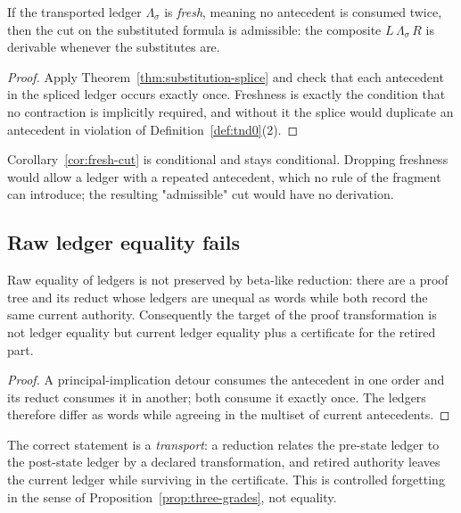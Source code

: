 \begin{corollary}\label{cor:fresh-cut}
If the transported ledger $\Lambda_\sigma$ is \emph{fresh}, meaning no antecedent is
consumed twice, then the cut on the substituted formula is admissible: the composite
$L\,\Lambda_\sigma\,R$ is derivable whenever the substitutes are.
\end{corollary}

\begin{proof}
Apply Theorem~\ref{thm:substitution-splice} and check that each antecedent in the spliced
ledger occurs exactly once.  Freshness is exactly the condition that no contraction is
implicitly required, and without it the splice would duplicate an antecedent in violation
of Definition~\ref{def:tnd0}(2).
\end{proof}

\begin{remark}
Corollary~\ref{cor:fresh-cut} is conditional and stays conditional.  Dropping freshness
would allow a ledger with a repeated antecedent, which no rule of the fragment can
introduce; the resulting "admissible" cut would have no derivation.
\end{remark}

\subsection{Raw ledger equality fails}

\begin{nogo}\label{nogo:raw-ledger}
Raw equality of ledgers is not preserved by beta-like reduction: there are a proof tree and
its reduct whose ledgers are unequal as words while both record the same current authority.
Consequently the target of the proof transformation is not ledger equality but current
ledger equality plus a certificate for the retired part.
\end{nogo}

\begin{proof}
A principal-implication detour consumes the antecedent in one order and its reduct consumes
it in another; both consume it exactly once.  The ledgers therefore differ as words while
agreeing in the multiset of current antecedents.
\end{proof}

\begin{proposal}\label{prop:ledger-transport}
The correct statement is a \emph{transport}: a reduction relates the pre-state ledger to the
post-state ledger by a declared transformation, and retired authority leaves the current
ledger while surviving in the certificate.  This is controlled forgetting in the sense of
Proposition~\ref{prop:three-grades}, not equality.
\end{proposal}

